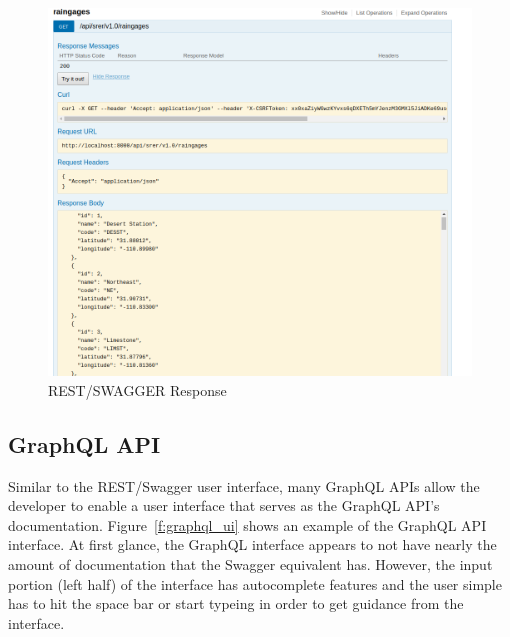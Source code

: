\begin{figure}[htb]
  \centering\includegraphics[width=\columnwidth]
  {./images/srer_rest_raingage_list.png}
  \caption{REST/SWAGGER Response}\label{f:srer_rest_raingage_list}
\end{figure}

\subsection{GraphQL API}
Similar to the REST/Swagger user interface, many GraphQL APIs allow the 
developer to enable a user interface that serves as the GraphQL API's 
documentation.  Figure~\ref{f:graphql_ui} shows an example of the GraphQL API 
interface.  At first glance, the GraphQL interface appears to not have nearly 
the amount of documentation that the Swagger equivalent has.  However, the 
input portion (left half) of the interface has autocomplete features and the 
user simple has to hit the space bar or start typeing in order to get guidance 
from the interface.

